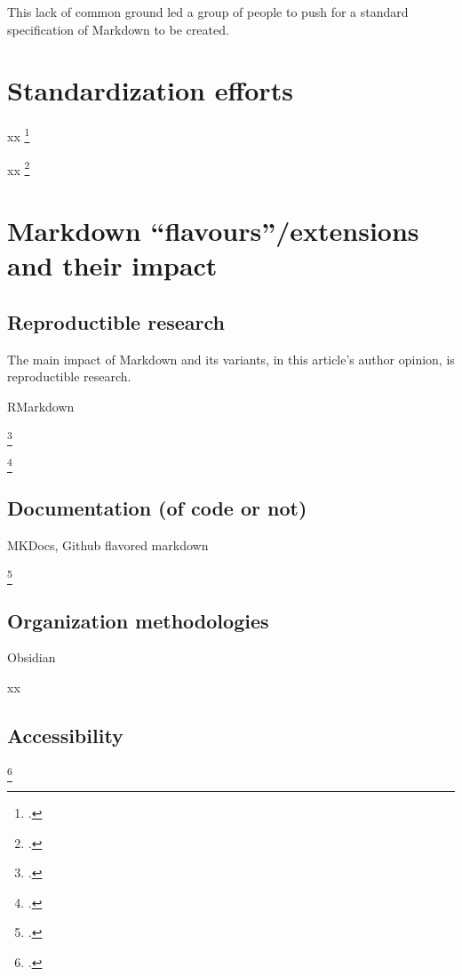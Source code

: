 This lack of common ground led a group of people to push for a standard specification of Markdown to be created.

\section{Standardization efforts}

xx \footcite{leonard2016text}

xx \footcite{commonmark}

\section{Markdown ``flavours''/extensions and their impact}

\subsection{Reproductible research}

The main impact of Markdown and its variants, in this article's author opinion, is reproductible research.

RMarkdown

\footcite{voegler2014markdown}

\footcite{racine2019energy}

\subsection{Documentation (of code or not)}

MKDocs,
Github flavored markdown

\footcite{kopp2018markdown}

\subsection{Organization methodologies}

Obsidian

xx

\subsection{Accessibility}

\footcite{oelen2019content}